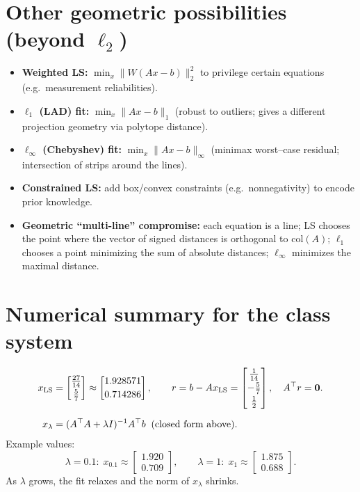 \documentclass[12pt,a4paper]{article}
\begin{document}
\section{Other geometric possibilities (beyond $\ell_2$)}
\begin{itemize}[leftmargin=1.4em]
\item \textbf{Weighted LS:} $\min_x \|W(Ax-b)\|_2^2$ to privilege certain equations (e.g.\ measurement reliabilities).
\item \textbf{$\ell_1$ (LAD) fit:} $\min_x \|Ax-b\|_1$ (robust to outliers; gives a different projection geometry via polytope distance).
\item \textbf{$\ell_\infty$ (Chebyshev) fit:} $\min_x \|Ax-b\|_\infty$ (minimax worst–case residual; intersection of strips around the lines).
\item \textbf{Constrained LS:} add box/convex constraints (e.g.\ nonnegativity) to encode prior knowledge.
\item \textbf{Geometric “multi-line” compromise:} each equation is a line; LS chooses the point where the vector of signed distances is orthogonal to $\mathrm{col}(A)$; $\ell_1$ chooses a point minimizing the sum of absolute distances; $\ell_\infty$ minimizes the maximal distance.
\end{itemize}

\section{Numerical summary for the class system}
\begin{align*}
x_{\rm LS} &= \begin{bmatrix}\tfrac{27}{14}\\[2pt]\tfrac{5}{7}\end{bmatrix}
\approx \begin{bmatrix}1.928571\\[2pt]0.714286\end{bmatrix},\qquad
r=b-Ax_{\rm LS}=\begin{bmatrix}\tfrac{1}{14}\\[2pt]-\tfrac{5}{7}\\[2pt]\tfrac{1}{2}\end{bmatrix},\quad
A^\top r=\bm{0}.\\[6pt]
x_\lambda &= (A^\top A+\lambda I)^{-1}A^\top b
\;\;\text{(closed form above)}.
\end{align*}
Example values:
\[
\lambda=0.1:\;
x_{0.1}\approx\begin{bmatrix}1.920\\[2pt]0.709\end{bmatrix},\qquad
\lambda=1:\;
x_{1}\approx\begin{bmatrix}1.875\\[2pt]0.688\end{bmatrix}.
\]
As $\lambda$ grows, the fit relaxes and the norm of $x_\lambda$ shrinks.
\end{document}
